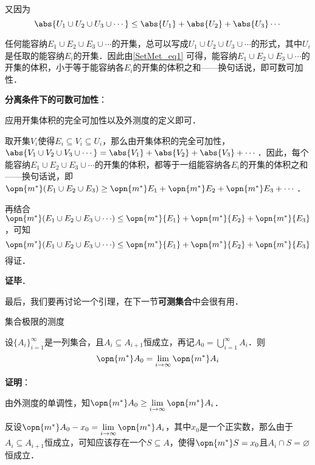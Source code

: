 又因为
\begin{equation}\label{SetMet_eq1}
\abs{U_1\cup U_2\cup U_3\cup \cdots} \leq \abs{U_1}+\abs{U_2}+\abs{U_3}\cdots
\end{equation}

任何能容纳$E_1\cup E_2\cup E_3\cup \cdots $的开集，总可以写成$U_1\cup U_2\cup U_3\cup \cdots$的形式，其中$U_i$是任取的能容纳$E_i$的开集．因此由\autoref{SetMet_eq1} 可得，能容纳$E_1\cup E_2\cup E_3\cup \cdots $的开集的体积，小于等于能容纳各$E_i$的开集的体积之和——换句话说，即可数可加性．

\textbf{分离条件下的可数可加性}：

应用开集体积的完全可加性以及外测度的定义即可．

取开集$V_i$使得$E_i\subseteq V_i\subseteq U_i$，那么由开集体积的完全可加性，$\abs{V_1\cup V_2\cup V_3\cup \cdots}=\abs{V_1}+\abs{V_2}+\abs{V_3}+\cdots$．因此，每个能容纳$E_1\cup E_2\cup E_3\cup\cdots$的开集的体积，都等于一组能容纳各$E_i$的开集的体积之和——换句话说，即$\opn{m^*}(E_1\cup E_2\cup E_3)\geq\opn{m^*}E_1+\opn{m^*}E_2+\opn{m^*}E_3+\cdots$．

再结合$\opn{m^*}({E_1\cup E_2\cup E_3\cup \cdots})\leq \opn{m^*}{E_1}+\opn{m^*}{E_2}+\opn{m^*}{E_3}$，可知
\begin{equation}
\opn{m^*}({E_1\cup E_2\cup E_3\cup \cdots})\leq \opn{m^*}{E_1}+\opn{m^*}{E_2}+\opn{m^*}{E_3}
\end{equation}
得证．

\textbf{证毕}．

最后，我们要再讨论一个引理，在下一节\textbf{可测集合}中会很有用．

\begin{lemma}{集合极限的测度}\label{SetMet_lem1}

设$\{A_i\}_{i=1}^\infty$是一列集合，且$A_{i}\subseteq A_{i+1}$恒成立，再记$A_0=\bigcup_{i=1}^\infty A_i$．则
\begin{equation}
\opn{m^*}A_0=\lim\limits_{i\to\infty}\opn{m^*}A_i
\end{equation}

\end{lemma}


\textbf{证明}：

由外测度的单调性，知$\opn{m^*}A_0\geq\lim\limits_{i\to\infty}\opn{m^*}A_i$．

反设$\opn{m^*}A_0-x_0=\lim\limits_{i\to\infty}\opn{m^*}A_i$，其中$x_0$是一个正实数，那么由于$A_{i}\subseteq A_{i+1}$恒成立，可知应该存在一个$S\subseteq A$，使得$\opn{m^*}S=x_0$且$A_i\cap S=\varnothing$恒成立．

